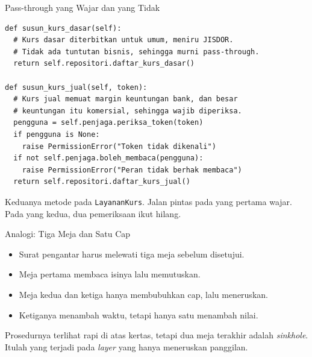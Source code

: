 \documentclass[aspectratio=169, table, 12pt]{beamer}
\begin{document}
\begin{frame}[fragile]{{\Large Pass-through yang Wajar dan yang Tidak}}
  \vspace{5pt}
\begin{lstlisting}[style=PythonStyle]
def susun_kurs_dasar(self):
  # Kurs dasar diterbitkan untuk umum, meniru JISDOR.
  # Tidak ada tuntutan bisnis, sehingga murni pass-through.
  return self.repositori.daftar_kurs_dasar()

def susun_kurs_jual(self, token):
  # Kurs jual memuat margin keuntungan bank, dan besar
  # keuntungan itu komersial, sehingga wajib diperiksa.
  pengguna = self.penjaga.periksa_token(token)
  if pengguna is None:
    raise PermissionError("Token tidak dikenali")
  if not self.penjaga.boleh_membaca(pengguna):
    raise PermissionError("Peran tidak berhak membaca")
  return self.repositori.daftar_kurs_jual()
\end{lstlisting}

  \vspace{3pt}
  {\small Keduanya metode pada \texttt{LayananKurs}. Jalan pintas pada yang
  pertama wajar. Pada yang kedua, dua pemeriksaan ikut hilang.}
\end{frame}

\begin{frame}{{\Large Analogi: Tiga Meja dan Satu Cap}}
  \vspace{10pt}
  \begin{itemize}
    \item Surat pengantar harus melewati tiga meja sebelum disetujui.
    \item Meja pertama membaca isinya lalu memutuskan.
    \item Meja kedua dan ketiga hanya membubuhkan cap, lalu meneruskan.
    \item Ketiganya menambah waktu, tetapi hanya satu menambah nilai.
  \end{itemize}

  \vspace{10pt}
  {\small Prosedurnya terlihat rapi di atas kertas, tetapi dua meja terakhir
  adalah \textit{sinkhole}. Itulah yang terjadi pada \textit{layer} yang hanya
  meneruskan panggilan.}
\end{frame}
\end{document}
